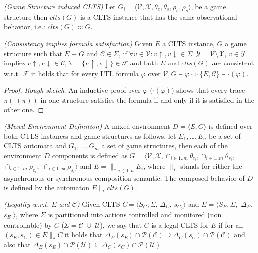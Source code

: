 \begin{definition}
	\label{def:gs_conversion} \emph{(Game Structure induced CLTS)} 
	Let $G_i=\langle \mathcal{V}, \mathcal{X}, \theta_{e}, \theta_{s}, \rho_{e}, \rho_{s}\rangle$, be a game structure then $clts(G)$ is a CLTS instance that has the same observational behavior, i.e.: $clts(G) \approx G$. 
\end{definition}

\begin{lemma}
	\label{def:gs_clts_equiv_implies_satifaction} \emph{(Consistency implies formula satisfaction)} 
	Given $E$ a CLTS instance, $G$ a game structure such that $E \equiv G$ and $\mathcal{C} \in \Sigma$, if $\forall v \in \mathcal{V}: v\uparrow, v\downarrow \in \Sigma$, 
$\mathcal{Y} = \mathcal{V}\setminus \mathcal{X}$, $v \in \mathcal{Y}$ implies $v\uparrow, v\downarrow \in \mathcal{C}$, $\dot{v} = \lbrace v\uparrow, v\downarrow \rbrace \in \mathcal{F}$ and both $E$ and $clts(G)$ are consistent w.r.t. $\mathcal{F}$ it holds that for every LTL formula $\varphi$ over $\mathcal{V}, G \models \varphi \iff \lbrace E, \mathcal{C} \rbrace \models \cdot(\varphi)$.
\end{lemma}

\begin{proof}
\emph{Rough sketch.} An inductive proof over $\varphi$ ($\cdot(\varphi)$) shows that every trace $\pi (\cdot(\pi))$ in one structure satisfies the formula if and only if it is satisfied in the other one. 
\end{proof}

\begin{definition}
	\label{def:mixed_env} \emph{(Mixed Environment Definition)} 
	A mixed environment $D = \langle E, G \rangle$ is defined over both CTLS instances and game structures as follows,
	let $E_1,\ldots,E_n$ be a set of CLTS automata and $G_1,\ldots,G_m$ a set of game structures,
	then each of the environment $D$ components is defined as $G=\langle \mathcal{V}, \mathcal{X}, \cap_{i \in 1..m}\theta_{e_i}, \cap_{i \in 1..m}\theta_{s_i},$ $\cap_{i \in 1..m}\rho_{e_i},$ $\cap_{i \in 1..m}\rho_{s_i}\rangle$ and $E = \parallel_{*,i \in 1..n} E_i$, where $\parallel_*$ stands for either the asynchronous or synchronous composition semantic.
	The composed behavior of $D$ is defined by the automaton $E \parallel_* clts(G)$.
\end{definition}

\begin{definition}
	\label{def:legal_clts} \emph{(Legality w.r.t. $E$ and $\mathcal{C}$)} 
	Given CLTS $C = \langle S_C, \Sigma$, $\Delta_C$, $s_{C_0}\rangle$ and $E = \langle S_E,\Sigma,$ $\Delta_E,$ $s_{E_0}\rangle$, where $\Sigma$ is partitioned into actions controlled and monitored (non controllable) by $C$ ($\Sigma=\mathcal{C} \; \cup \;\mathcal{U}$), we say that $C$ is a legal CLTS for $E$ if for all $(s_E,s_C) \in E \parallel_* C$ it holds that
	$\Delta_{E}(s_E)\cap \mathcal{P}(\mathcal{C}) \supseteq \Delta_{C}(s_C)\cap \mathcal{P}(\mathcal{C})$ and also that  $\Delta_{E}(s_E)\cap \mathcal{P}(\mathcal{U}) \subseteq \Delta_{C}(s_C)\cap \mathcal{P}(\mathcal{U})$.
\end{definition}

